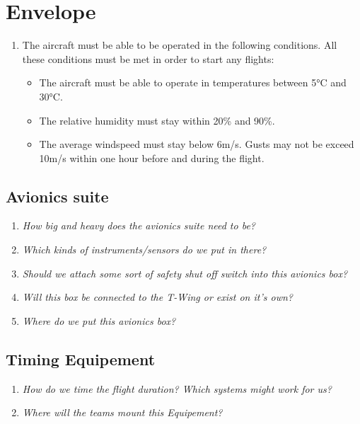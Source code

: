 \documentclass{article}
\begin{document}
\section{Envelope}
\begin{enumerate}
  \item The aircraft must be able to be operated in the following conditions. All these conditions must be met in order to start any flights:
\begin {itemize}
  \item The aircraft must be able to operate in temperatures between 5°C and 30°C.
  \item The relative humidity must stay within 20\% and 90\%. 
  \item The average windspeed must stay below 6m/s. Gusts may not be exceed 10m/s within one hour before and during the flight.
  
\end {itemize}
\end{enumerate}

\subsection{Avionics suite}
\begin{enumerate}
  \item \emph{How big and heavy does the avionics suite need to be?}
  \item \emph{Which kinds of instruments/sensors do we put in there?}
  \item \emph{Should we attach some sort of safety shut off switch into this avionics box?}
  \item \emph{Will this box be connected to the T-Wing or exist on it's own?}
  \item \emph{Where do we put this avionics box?}
\end{enumerate}

\subsection{Timing Equipement}
\begin{enumerate}
  \item \emph{How do we time the flight duration? Which systems might work for us?}
  \item \emph{Where will the teams mount this Equipement?}
\end{enumerate}
\end{document}
